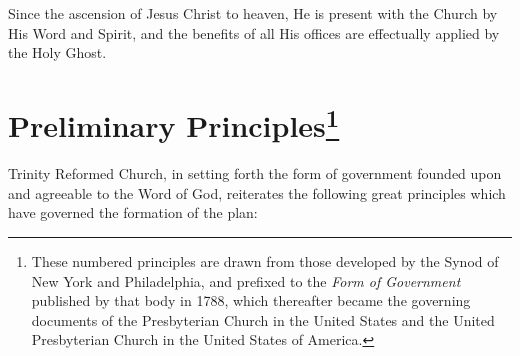 \documentclass[
]{book}
\begin{document}
Since the ascension of Jesus Christ to heaven, He is present with the Church by His Word and Spirit, and the benefits of all His offices are effectually applied by the Holy Ghost.

\hypertarget{preliminary-principles1}{%
\section[Preliminary Principles]{\texorpdfstring{Preliminary Principles\footnote{These numbered principles are drawn from those developed by the Synod of New York and Philadelphia, and prefixed to the \emph{Form of Government} published by that body in 1788, which thereafter became the governing documents of the Presbyterian Church in the United States and the United Presbyterian Church in the United States of America.}}{Preliminary Principles}}\label{preliminary-principles1}}

Trinity Reformed Church, in setting forth the form of government founded upon and agreeable to the Word of God, reiterates the following great principles which have governed the formation of the plan:
\end{document}
